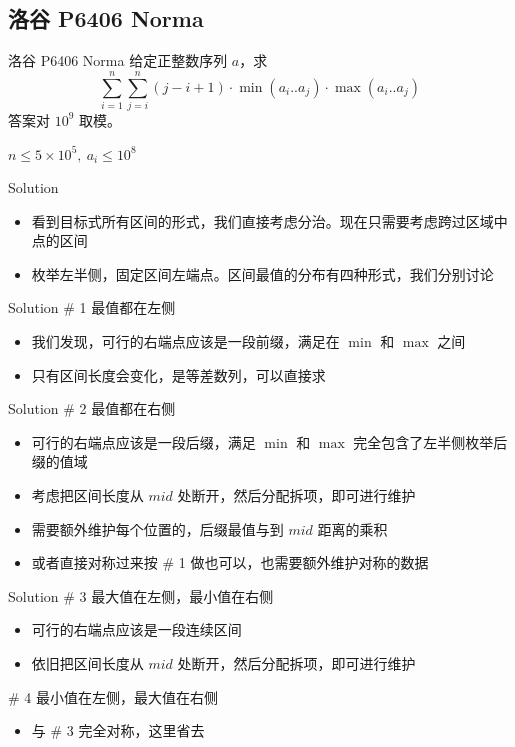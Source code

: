 ﻿\documentclass[aspectratio=169,handout]{ctexbeamer}
\begin{document}
\subsection{洛谷 P6406 Norma}
\begin{frame}{洛谷 P6406 Norma}
    给定正整数序列 $a$，求
    $$\sum_{i=1}^n\sum_{j=i}^n (j-i+1)\cdot\min(a_i..a_j)\cdot\max(a_i..a_j)$$
    答案对 $10^9$ 取模。
    
    $n\le 5\times10^5,\ a_i\le 10^8$
\end{frame}

\begin{frame}{Solution}
    \begin{itemize}
        \item 看到目标式所有区间的形式，我们直接考虑分治。现在只需要考虑跨过区域中点的区间
        \item 枚举左半侧，固定区间左端点。区间最值的分布有四种形式，我们分别讨论
    \end{itemize}
\end{frame}

\begin{frame}{Solution}
    \# 1 最值都在左侧
    \begin{itemize}
        \item 我们发现，可行的右端点应该是一段前缀，满足在 $\min$ 和 $\max$ 之间
        \item 只有区间长度会变化，是等差数列，可以直接求
    \end{itemize}
\end{frame}

\begin{frame}{Solution}
    \# 2 最值都在右侧
    \begin{itemize}
        \item 可行的右端点应该是一段后缀，满足 $\min$ 和 $\max$ 完全包含了左半侧枚举后缀的值域
        \item 考虑把区间长度从 $mid$ 处断开，然后分配拆项，即可进行维护
        \item 需要额外维护每个位置的，后缀最值与到 $mid$ 距离的乘积
        \item 或者直接对称过来按 \# 1 做也可以，也需要额外维护对称的数据
    \end{itemize}
\end{frame}

\begin{frame}{Solution}
    \# 3 最大值在左侧，最小值在右侧
    \begin{itemize}
        \item 可行的右端点应该是一段连续区间
        \item 依旧把区间长度从 $mid$ 处断开，然后分配拆项，即可进行维护
    \end{itemize}
    \# 4 最小值在左侧，最大值在右侧
    \begin{itemize}
        \item 与 \# 3 完全对称，这里省去
    \end{itemize}
\end{frame}
\end{document}
